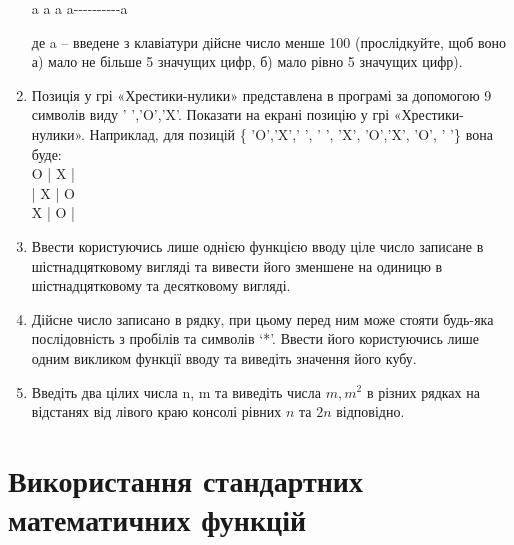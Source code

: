 \documentclass[]{article}
\begin{document}
\begin{enumerate}
a a a a-\/-\/-\/-\/-\/-\/-\/-\/-\/-a

де a -- введене з клавіатури дійсне число менше 100 (прослідкуйте, щоб
воно а) мало не більше 5 значущих цифр, б) мало рівно 5 значущих цифр).
\item
Позиція у грі «Хрестики-нулики» представлена в програмі за допомогою 9 символів виду ' ','O','X'.
Показати на екрані позицію у грі «Хрестики-нулики».
Наприклад, для позицій \{ 'O','X',' ', ' ', 'X', 'O','X', 'O', ' '\} вона буде:\\
O | X | \hspace*{7pt} \\
\hspace*{7pt} | X | O \\
X | O | \hspace*{7pt} \\

\item
Ввести користуючись лише однією функцією вводу ціле число записане в
шістнадцятковому вигляді та вивести його зменшене на одиницю в
шістнадцятковому та десятковому вигляді.
\item
Дійсне число записано в рядку, при цьому перед ним може стояти будь-яка
послідовність з пробілів та символів `*'. Ввести його користуючись лише
одним викликом функції вводу та виведіть значення його кубу.
\item
Введіть два цілих числа n, m та виведіть числа \(m,m^{2}\) в різних
рядках на відстанях від лівого краю консолі рівних \(n\) та \(2n\)
відповідно.
\end{enumerate}

\section{Використання стандартних математичних функцій}
\end{document}
